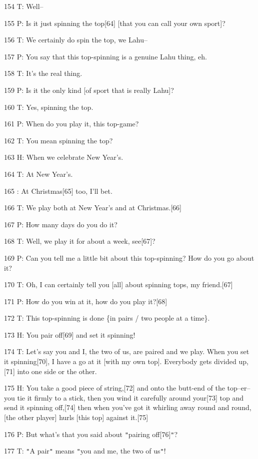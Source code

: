 154 T: Well--

155 P: Is it just spinning the top[64] [that you can call your own sport]?

156 T: We certainly do spin the top, we Lahu--

157 P: You say that this top-spinning is a genuine Lahu thing, eh.

158 T: It's the real thing.

159 P: Is it the only kind [of sport that is really Lahu]?

160 T: Yes, spinning the top.

161 P: When do you play it, this top-game?

162 T: You mean spinning the top?

163 H: When we celebrate New Year's.

164 T: At New Year's.

165    : At Christmas[65] too, I'll bet.

166 T: We play both at New Year's and at Christmas.[66]

167 P: How many days do you do it?

168 T: Well, we play it for about a week, see[67]?

169 P: Can you tell me a little bit about this top-spinning? How do you go about
it?

170 T: Oh, I can certainly tell you [all] about spinning tops, my friend.[67]

171 P: How do you win at it, how do you play it?[68]

172 T: This top-spinning is done \{in pairs / two people at a time\}.

173 H: You pair off[69] and set it spinning!

174 T: Let's say you and I, the two of us, are paired and we play. When you set
it spinning[70], I have a go at it [with my own top]. Everybody gets divided up,[71]
into one side or the other.

175 H: You take a good piece of string,[72] and onto the butt-end of the top--er--you
tie it firmly to a stick, then you wind it carefully around your[73] top and send
it spinning off,[74] then when you've got it whirling away round and round, [the
other player] hurls [this top] against it.[75]

176 P: But what's that you said about \texttt{"}pairing off[76]\texttt{"}?

177 T: \texttt{"}A pair\texttt{"} means \texttt{"}you and me, the two of us\texttt{"}!

